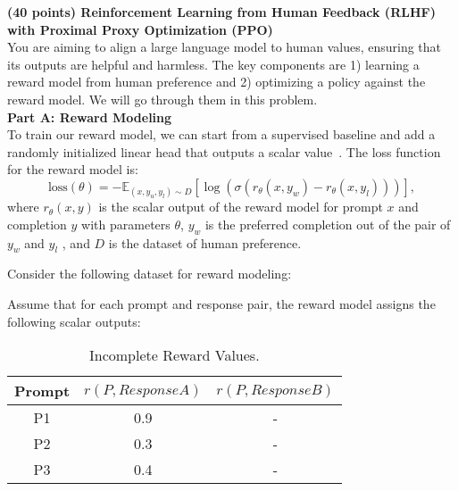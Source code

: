 
\item \textbf{(40 points) Reinforcement Learning from Human Feedback (RLHF) with Proximal Proxy Optimization (PPO)} \\
You are aiming to align a large language model to human values, ensuring that its outputs are helpful and harmless.
The key components are 1) learning a reward model from human preference and 2) optimizing a policy against the reward model. We will go through them in this problem. \\


\noindent\textbf{Part A: Reward Modeling}\\
 To train our reward model, we can start from a supervised baseline and add a randomly initialized linear head that outputs a scalar value~\cite{ziegler2019fine, ouyang2022training}. 
The loss function for the reward model is:
\begin{equation}
\text{loss}(\theta) = - \mathbb{E}_{(x,y_u,y_l) \sim D} \left[ \log \left( \sigma \left( r_{\theta}(x, y_w) - r_{\theta}(x, y_l) \right) \right) \right],
\end{equation}
where $r_{\theta}(x,y)$ is the scalar output of the reward model for prompt $x$ and completion $y$ with parameters
$\theta$, $y_w$ is the preferred completion out of the pair of $y_w$ and $y_l$
, and $D$ is the dataset of human preference. 

Consider the following dataset for reward modeling:
                                     
\begin{table}[!htb]
    \centering
    \caption{Reward Modeling Dataset.}
    \label{tab:my_label}
\end{table}

Assume that for each prompt and response pair, the reward model 
assigns the following scalar outputs:
\begin{table}[!htb]
    \centering
    \begin{tabular}{c|c|c}\toprule
         Prompt & $r(P, Response A)$ & $r(P, Response B)$ 
         \\\midrule
         P1 & 0.9 & - \\
         P2 & 0.3 & - \\
         P3 & 0.4 & - \\\bottomrule
    \end{tabular}%
    \caption{Incomplete Reward Values.}
    \label{tab:my_label}
\end{table}

